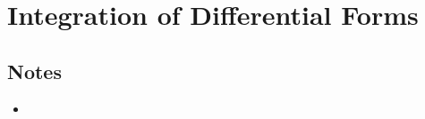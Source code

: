 \documentclass[../notes.tex]{subfiles}
\begin{document}
\chapter{Integration of Differential Forms}
\section{Notes}
\begin{itemize}
    \item {}
\end{itemize}
\end{document}
